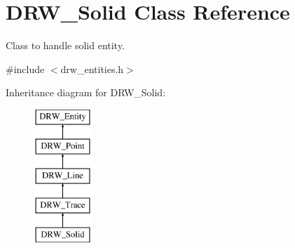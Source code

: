 \hypertarget{class_d_r_w___solid}{}\section{D\+R\+W\+\_\+\+Solid Class Reference}
\label{class_d_r_w___solid}


Class to handle solid entity.  




{\ttfamily \#include $<$drw\+\_\+entities.\+h$>$}

Inheritance diagram for D\+R\+W\+\_\+\+Solid\+:\begin{figure}[H]
\begin{center}
\leavevmode
\includegraphics[height=5.000000cm]{d6/dc1/class_d_r_w___solid}
\end{center}
\end{figure}
